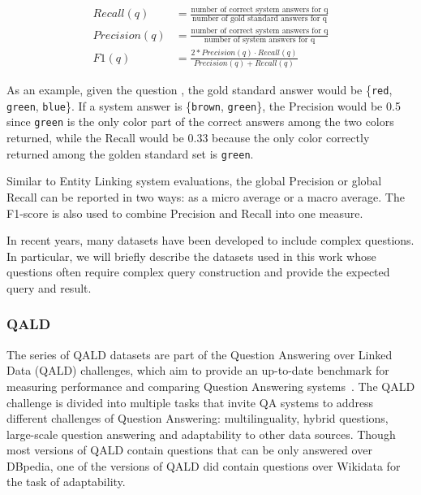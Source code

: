 \begin{equation}
    \begin{aligned}
    Recall(q) &= \frac{\mbox{number of correct system answers for q}}{\mbox{number of gold standard answers for q}} \\
    Precision(q) &= \frac{\mbox{number of correct system answers for q}}{\mbox{number of system answers for q}} \\
    F1(q) &= \frac{2 \ast Precision(q) \cdot Recall(q)}{Precision(q)+Recall(q)}
    \end{aligned}
\end{equation}

As an example, given the question , the gold standard 
answer would be \{\texttt{red}, \texttt{green}, \texttt{blue}\}. If a system answer is 
\{\texttt{brown}, \texttt{green}\}, the Precision would be 0.5 since \texttt{green} is the 
only color part of the correct answers among the two colors returned, while the Recall would be 
0.33 because the only color correctly returned among the golden standard set is \texttt{green}.

Similar to Entity Linking system evaluations, the global Precision or global Recall can be 
reported in two ways: as a micro average or a macro average. The F1-score is also used to 
combine Precision and Recall into one measure.

In recent years, many datasets have been developed to include complex questions. In particular, 
we will briefly describe the datasets used in this work whose questions often require complex 
query construction and provide the expected query and result.

\subsubsection{QALD}
\label{cap2:theoFrame/qakg/benchmarkDatasets/qald}
The series of QALD datasets are part of the Question Answering over Linked Data (QALD) challenges, 
which aim to provide an up-to-date benchmark for measuring performance and comparing Question 
Answering systems~\cite{qa:qald-Lopezetal2013}. The QALD challenge is divided into multiple 
tasks that invite QA systems to address different challenges of Question Answering: 
multilinguality, hybrid questions, large-scale question answering and adaptability to other 
data sources. Though most versions of QALD contain questions that can be only answered over 
DBpedia, one of the versions of QALD did contain questions over Wikidata for the task of 
adaptability.

